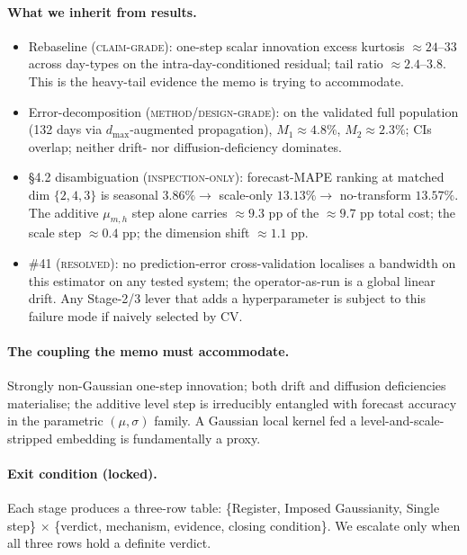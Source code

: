 \documentclass[11pt]{article}
\begin{document}
\paragraph{What we inherit from results.}
\begin{itemize}[leftmargin=2em]
  \item Rebaseline (\textsc{claim-grade}): one-step scalar
  innovation excess kurtosis \(\approx 24\)--\(33\) across day-types
  on the intra-day-conditioned residual; tail ratio \(\approx
  2.4\)--\(3.8\). This is the heavy-tail evidence the memo is trying
  to accommodate.
  \item Error-decomposition (\textsc{method/design-grade}): on the
  validated full population (132 days via \(d_{\max}\)-augmented
  propagation), \(M_1 \approx 4.8\%\), \(M_2 \approx 2.3\%\); CIs
  overlap; neither drift- nor diffusion-deficiency dominates.
  \item \S4.2 disambiguation (\textsc{inspection-only}):
  forecast-MAPE ranking at matched dim \(\{2,4,3\}\) is seasonal
  \(3.86\% \to\) scale-only \(13.13\% \to\) no-transform \(13.57\%\).
  The additive \(\mu_{m,h}\) step alone carries
  \(\approx 9.3\) pp of the \(\approx 9.7\) pp total cost; the
  scale step \(\approx 0.4\) pp; the dimension shift
  \(\approx 1.1\) pp.
  \item \#41 (\textsc{resolved}): no prediction-error
  cross-validation localises a bandwidth on this estimator on any
  tested system; the operator-as-run is a global linear drift. Any
  Stage-2/3 lever that adds a hyperparameter is subject to this
  failure mode if naively selected by CV.
\end{itemize}

\paragraph{The coupling the memo must accommodate.} Strongly
non-Gaussian one-step innovation; both drift and diffusion
deficiencies materialise; the additive level step is irreducibly
entangled with forecast accuracy in the parametric \((\mu, \sigma)\)
family. A Gaussian local kernel fed a level-and-scale-stripped
embedding is fundamentally a proxy.

\paragraph{Exit condition (locked).} Each stage produces a
three-row table: \{Register, Imposed Gaussianity, Single step\}
\(\times\) \{verdict, mechanism, evidence, closing condition\}. We
escalate only when all three rows hold a definite verdict.
\end{document}
